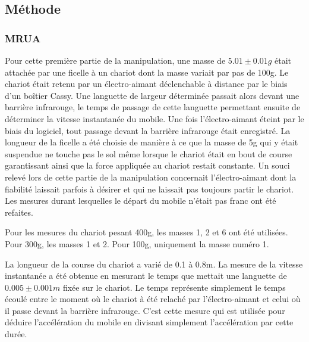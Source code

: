 \newpage
\subsection{Méthode}

\subsubsection{MRUA}
Pour cette première partie de la manipulation, une masse de $5.01 \pm 0.01g$ était attachée par une ficelle à un chariot dont la masse variait par pas de 100g. Le chariot était retenu par un électro-aimant déclenchable à distance par le biais d'un boîtier Cassy. Une languette de largeur déterminée passait alors devant une barrière infrarouge, le temps de passage de cette languette permettant ensuite de déterminer la vitesse instantanée du mobile. Une fois l'électro-aimant éteint par le biais du logiciel, tout passage devant la barrière infrarouge était enregistré.
La longueur de la ficelle a été choisie de manière à ce que la masse de 5g qui y était suspendue ne touche pas le sol même lorsque le chariot était en bout de course garantissant ainsi que la force appliquée au chariot restait constante.
Un souci relevé lors de cette partie de la manipulation concernait l'électro-aimant dont la fiabilité laissait parfois à désirer et qui ne laissait pas toujours partir le chariot. Les mesures durant lesquelles le départ du mobile n'était pas franc ont été refaites.

Pour les mesures du chariot pesant 400g, les masses 1, 2 et 6 ont été utilisées. Pour 300g, les masses 1 et 2. Pour 100g, uniquement la masse numéro 1.

La longueur de la course du chariot a varié de 0.1 à 0.8m. La mesure de la vitesse instantanée a été obtenue en mesurant le temps que mettait une languette de $0.005 \pm 0.001m$ fixée sur le chariot.
Le temps représente simplement le temps écoulé entre le moment où le chariot à été relaché par l'électro-aimant et celui où il passe devant la barrière infrarouge. C'est cette mesure qui est utilisée pour déduire l'accélération du mobile en divisant simplement l'accélération par cette durée.

